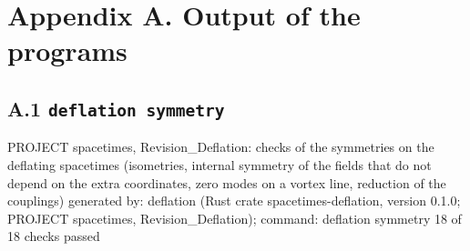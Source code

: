 \documentclass[
  10pt,
]{article}
\newenvironment{Shaded}{}{}
\newcommand{\NormalTok}[1]{#1}
\begin{document}
\hypertarget{appendix-a.-output-of-the-programs}{%
\section{Appendix A. Output of the
programs}\label{appendix-a.-output-of-the-programs}}

\hypertarget{a.1-deflation-symmetry}{%
\subsection{\texorpdfstring{A.1
\texttt{deflation\ symmetry}}{A.1 deflation symmetry}}\label{a.1-deflation-symmetry}}

\begin{Shaded}
\begin{Highlighting}[]
\NormalTok{PROJECT spacetimes, Revision\_Deflation: checks of the symmetries on the deflating spacetimes (isometries, internal symmetry of the fields that do not depend on the extra coordinates, zero modes on a vortex line, reduction of the couplings)}
\NormalTok{generated by: deflation (Rust crate spacetimes{-}deflation, version 0.1.0; PROJECT spacetimes, Revision\_Deflation); command: deflation symmetry}
\NormalTok{18 of 18 checks passed}


\end{Highlighting}
\end{Shaded}
\end{document}

